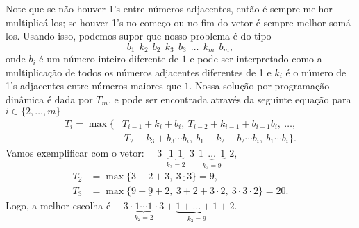\begin{questions}
\begin{solution}
    Note que se não houver 1's entre números adjacentes, então é sempre melhor multiplicá-los; se houver 1's no começo ou no fim do vetor é sempre melhor somá-los. Usando isso, podemos supor que nosso problema é do tipo
    \[ b_1~~k_2~~b_2~~k_3~~b_3~~\dots~~k_m~~b_m, \]
    onde $b_i$ é um número inteiro diferente de $1$ e pode ser interpretado como a multiplicação de todos os números adjacentes diferentes de 1 e $k_i$ é o número de 1's adjacentes entre números maiores que $1$. Nossa solução por programação dinâmica é dada por $T_m$, e pode ser encontrada através da seguinte equação para $i\in\{2,\dots,m\}$
    \begin{align*}
        T_i = \max\big\{&T_{i-1}+k_i+b_i,~ T_{i-2}+k_{i-1}+b_{i-1}b_i,~\dots,\\
            & ~T_2+k_3+b_3\cdots b_i,~ b_1+k_2+b_2\cdots b_i,~ b_1 \cdots b_i\big\}.
    \end{align*}
    Vamos exemplificar com o vetor: $\quad3~~\underbrace{1~~1}_{k_2=2}~~3~~\underbrace{1~~\dots~~1}_{k_3=9}~~2$,
    \begin{align*}
        T_2 &= \max\{3 + 2 + 3,~ \underline{3\cdot 3}\} = 9,\\
        T_3 &= \max\{\underline{9 + 9 + 2},~ 3 + 2 + 3\cdot 2,~ 3\cdot 3\cdot 2\} = 20.
    \end{align*}
    Logo, a melhor escolha é $\quad3 \cdot \underbrace{1\cdots 1}_{k_2=2}\cdot 3+\underbrace{1+\dots+1}_{k_3=9}+2$.
\end{solution}

\end{questions}

